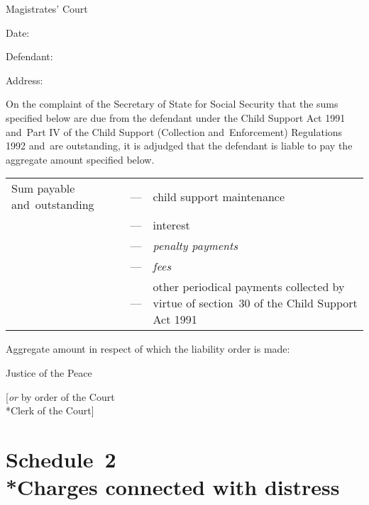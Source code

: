 \documentclass[12pt,a4paper]{article}
\begin{document}
\medskip

{\raggedleft \hspace{0.5\linewidth}\dotfill Magistrates' Court

}

\medskip

Date:

\medskip

Defendant:

\medskip

Address:

\medskip

On the complaint of the Secretary of State for Social Security that the sums specified below are due from the defendant under the Child Support Act 1991 and~Part IV of the Child Support (Collection and~Enforcement) Regulations 1992 and~are outstanding, it is adjudged that the defendant is liable to pay the aggregate amount specified below.

\medskip

\noindent
\begin{tabulary}{0.9\linewidth}{lJJ}
Sum payable and~outstanding \hspace{0.075\linewidth} &  --- & child support maintenance\\
&--- & interest\\
&--- & \emph {penalty payments}\\
&--- & \emph {fees}\\
& --- & other periodical payments collected by virtue of section~30 of the Child Support Act 1991\\
\end{tabulary}

\medskip

Aggregate amount in respect of which the liability order is made:

\medskip

{\raggedleft Justice of the Peace

\medskip

[\emph{or} by order of the Court\\*Clerk of the Court]

}


\part[Schedule~2 --- Charges connected with distress]{Schedule~2\\*Charges connected with distress}
\end{document}
